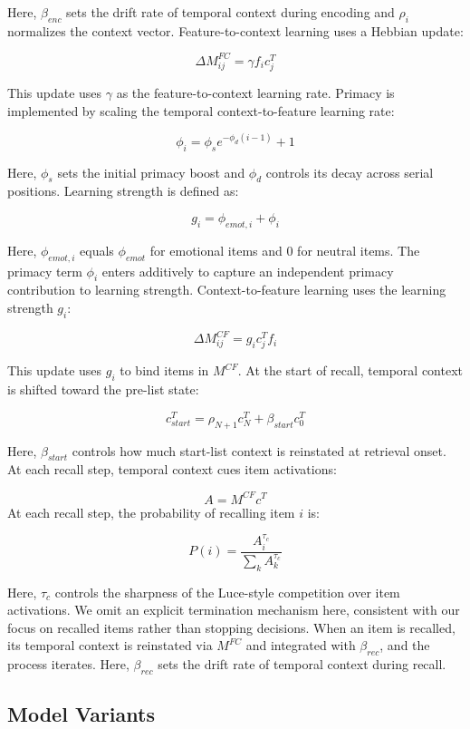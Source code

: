 \documentclass[
  letterpaper,
  DIV=11,
  numbers=noendperiod]{scrartcl}
\begin{document}
Here, \(\beta_{enc}\) sets the drift rate of temporal context during
encoding and \(\rho_i\) normalizes the context vector.
Feature-to-context learning uses a Hebbian update:

\[
\Delta M^{FC}_{ij} = \gamma f_i c^T_j
\]

This update uses \(\gamma\) as the feature-to-context learning rate.
Primacy is implemented by scaling the temporal context-to-feature
learning rate:

\[
\phi_i = \phi_s e^{-\phi_d(i-1)} + 1
\]

Here, \(\phi_s\) sets the initial primacy boost and \(\phi_d\) controls
its decay across serial positions. Learning strength is defined as:

\[
g_i = \phi_{emot,i} + \phi_i
\]

Here, \(\phi_{emot,i}\) equals \(\phi_{emot}\) for emotional items and 0
for neutral items. The primacy term \(\phi_i\) enters additively to
capture an independent primacy contribution to learning strength.
Context-to-feature learning uses the learning strength \(g_i\):

\[
\Delta M^{CF}_{ij} = g_i c^T_j f_i
\]

This update uses \(g_i\) to bind items in \(M^{CF}\). At the start of
recall, temporal context is shifted toward the pre-list state:

\[
c^T_{start} = \rho_{N+1} c^T_N + \beta_{start} c^T_0
\]

Here, \(\beta_{start}\) controls how much start-list context is
reinstated at retrieval onset. At each recall step, temporal context
cues item activations:

\[
A = M^{CF} c^T
\] At each recall step, the probability of recalling item \(i\) is:

\[
P(i) = \frac{A_i^{\tau_c}}{\sum_k A_k^{\tau_c}}
\]

Here, \(\tau_c\) controls the sharpness of the Luce-style competition
over item activations. We omit an explicit termination mechanism here,
consistent with our focus on recalled items rather than stopping
decisions. When an item is recalled, its temporal context is reinstated
via \(M^{FC}\) and integrated with \(\beta_{rec}\), and the process
iterates. Here, \(\beta_{rec}\) sets the drift rate of temporal context
during recall.

\subsection{Model Variants}\label{model-variants}
\end{document}
